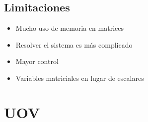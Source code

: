 \subsection*{Limitaciones}
\begin{itemize}
\item Mucho uso de memoria en matrices
\item Resolver el sistema es más complicado
\item Mayor control
\item Variables matriciales en lugar de escalares
\end{itemize}

\section{UOV}

